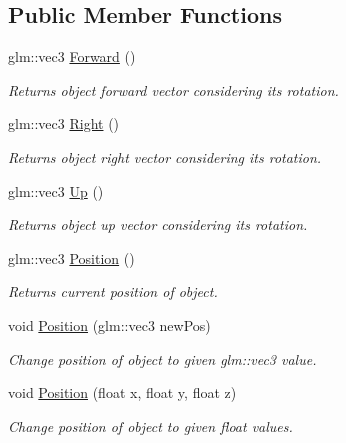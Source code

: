 \subsection*{Public Member Functions}
\begin{DoxyCompactItemize}
\item 
glm\+::vec3 \mbox{\hyperlink{class_transform_a5486927ebcb043b7347644041024f47c}{Forward}} ()
\begin{DoxyCompactList}\small\item\em Returns object forward vector considering it\textquotesingle{}s rotation. \end{DoxyCompactList}\item 
glm\+::vec3 \mbox{\hyperlink{class_transform_ad8a1ed0e1024d93a8722e6d1b8e886c8}{Right}} ()
\begin{DoxyCompactList}\small\item\em Returns object right vector considering it\textquotesingle{}s rotation. \end{DoxyCompactList}\item 
glm\+::vec3 \mbox{\hyperlink{class_transform_a647f01f73a5ad2d729080649bc477b76}{Up}} ()
\begin{DoxyCompactList}\small\item\em Returns object up vector considering it\textquotesingle{}s rotation. \end{DoxyCompactList}\item 
glm\+::vec3 \mbox{\hyperlink{class_transform_ab3aa7217c2b53146ae0ec4a4eddf3ba0}{Position}} ()
\begin{DoxyCompactList}\small\item\em Returns current position of object. \end{DoxyCompactList}\item 
void \mbox{\hyperlink{class_transform_a1f5f28293a7e54f8330f4090ea38b9f7}{Position}} (glm\+::vec3 new\+Pos)
\begin{DoxyCompactList}\small\item\em Change position of object to given glm\+::vec3 value. \end{DoxyCompactList}\item 
void \mbox{\hyperlink{class_transform_a8d24b66e54f0489c03389a6424f0bb21}{Position}} (float x, float y, float z)
\begin{DoxyCompactList}\small\item\em Change position of object to given float values. \end{DoxyCompactList}\item 

\end{DoxyCompactItemize}

